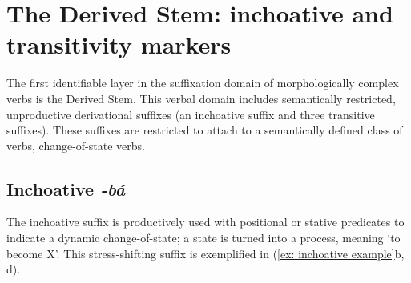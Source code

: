 \section{The Derived Stem: inchoative and transitivity markers}
\label{sec: the derived stem}

The first identifiable layer in the suffixation domain of morphologically complex verbs is the Derived Stem. This verbal domain includes semantically restricted, unproductive derivational suffixes (an inchoative suffix and three transitive suffixes). These suffixes are restricted to attach to a semantically defined class of verbs, change-of-state verbs.

\subsection{Inchoative \textit{-bá}}
\label{subsec: inchoative}

The inchoative suffix is productively used with positional or stative predicates to indicate a dynamic change-of-state; a state is turned into a process, meaning ‘to become X’. This stress-shifting suffix is exemplified in (\ref{ex: inchoative example}b, d).

\ea\label{ex: inchoative example}


    \z
\z

